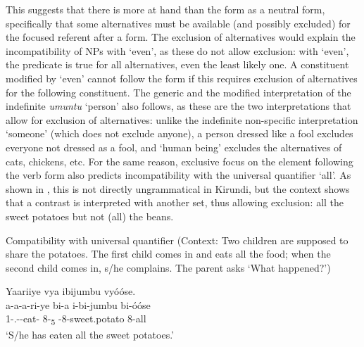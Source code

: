 \documentclass[output=paper]{langscibook}
\begin{document}
\z
\z

This suggests that there is more at hand than the \CJ{} form as a neutral form, specifically that some alternatives must be available (and possibly excluded) for the focused referent after a \CJ{} form. The exclusion of alternatives would explain the incompatibility of NPs with ‘even’, as these do not allow exclusion: with ‘even’,  the predicate is true for all alternatives, even the least likely one. A constituent modified by ‘even’ cannot follow the \CJ{} form if this requires exclusion of alternatives for the following constituent. The generic and the modified interpretation of the indefinite \textit{umuntu} ‘person’ also follows, as these are the two interpretations that allow for exclusion of alternatives: unlike the indefinite non-specific interpretation ‘someone’ (which does not exclude anyone), a person dressed like a fool excludes everyone not dressed as a fool, and ‘human being’ excludes the alternatives of cats, chickens, etc. For the same reason, exclusive focus on the element following the \CJ{} verb form also predicts incompatibility with the universal quantifier ‘all’. As shown in , this is not directly ungrammatical in Kirundi, but the context shows that a contrast is interpreted with another set, thus allowing exclusion: all the sweet potatoes but not (all) the beans.\pagebreak

\ea
Compatibility with universal quantifier
\ea
(Context: Two children are supposed to share the potatoes. The first child comes in and eats all the food; when the second child comes in, s/he complains. The parent asks ‘What happened?’)\\
\begin{xlist}
\exi{\DJ}
Yaariiye vya ibijumbu vyóóse.\\
\gll
a-a-a-ri-ye  bi-a  i-bi-jumbu  bi-óóse\\
1\SM-\N.\PST-\DJ{}-eat-\PFV{}  8-\DEM{}\textsubscript{5}  \AUG{}-8-sweet.potato  8-all\\
\glt
‘S/he has eaten all the sweet potatoes.’\\
    
\end{xlist}
\end{document}
